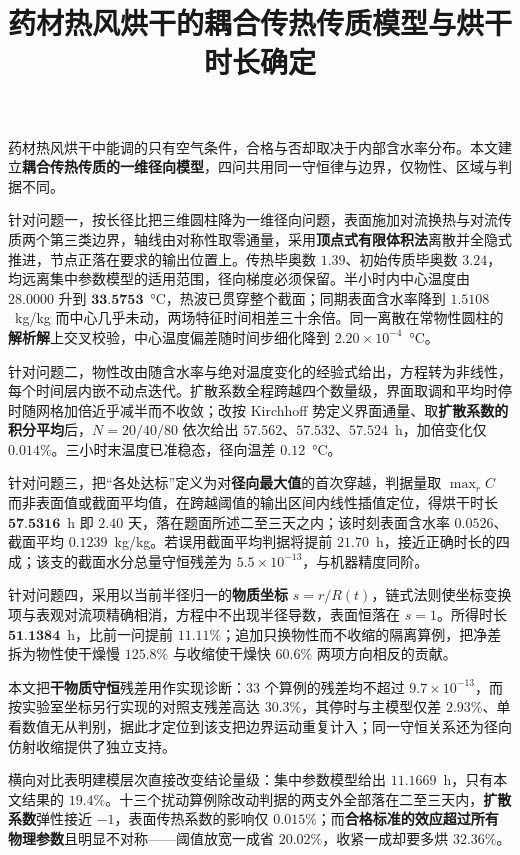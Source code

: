 \documentclass[withoutpreface,bwprint]{cumcmthesis}
\title{药材热风烘干的耦合传热传质模型与烘干时长确定}
\makeatletter
\renewenvironment{abstract}{%
  \if@twocolumn\section*{\abstractname}%
  \else\begin{center}{\zihao{3}\bfseries \abstractname\vspace{-.5em}\vspace{\z@}}\end{center}\quotation
  \fi}{\if@twocolumn\else\endquotation\newpage\fi}
\makeatother
\begin{document}
\maketitle

\begin{abstract}

药材热风烘干中能调的只有空气条件，合格与否却取决于内部含水率分布。本文建立\textbf{耦合传热传质的一维径向模型}，四问共用同一守恒律与边界，仅物性、区域与判据不同。

针对问题一，按长径比把三维圆柱降为一维径向问题，表面施加对流换热与对流传质两个第三类边界，轴线由对称性取零通量，采用\textbf{顶点式有限体积法}离散并全隐式推进，节点正落在要求的输出位置上。传热毕奥数 $1.39$、初始传质毕奥数 $3.24$，均远离集中参数模型的适用范围，径向梯度必须保留。半小时内中心温度由 $28.0000$ 升到 $\textbf{33.5753}$~°C，热波已贯穿整个截面；同期表面含水率降到 $1.5108$~kg/kg 而中心几乎未动，两场特征时间相差三十余倍。同一离散在常物性圆柱的\textbf{解析解}上交叉校验，中心温度偏差随时间步细化降到 $2.20\times10^{-4}$~°C。

针对问题二，物性改由随含水率与绝对温度变化的经验式给出，方程转为非线性，每个时间层内嵌不动点迭代。扩散系数全程跨越四个数量级，界面取调和平均时停时随网格加倍近乎减半而不收敛；改按 Kirchhoff 势定义界面通量、取\textbf{扩散系数的积分平均}后，$N=20/40/80$ 依次给出 $57.562$、$57.532$、$57.524$~h，加倍变化仅 $0.014\%$。三小时末温度已准稳态，径向温差 $0.12$~°C。

针对问题三，把“各处达标”定义为对\textbf{径向最大值}的首次穿越，判据量取 $\max_r C$ 而非表面值或截面平均值，在跨越阈值的输出区间内线性插值定位，得烘干时长 $\textbf{57.5316}$~h 即 $2.40$ 天，落在题面所述二至三天之内；该时刻表面含水率 $0.0526$、截面平均 $0.1239$~kg/kg。若误用截面平均判据将提前 $21.70$~h，接近正确时长的四成；该支的截面水分总量守恒残差为 $5.5\times10^{-13}$，与机器精度同阶。

针对问题四，采用以当前半径归一的\textbf{物质坐标} $s=r/R(t)$，链式法则使坐标变换项与表观对流项精确相消，方程中不出现半径导数，表面恒落在 $s=1$。所得时长 $\textbf{51.1384}$~h，比前一问提前 $11.11\%$；追加只换物性而不收缩的隔离算例，把净差拆为物性使干燥慢 $125.8\%$ 与收缩使干燥快 $60.6\%$ 两项方向相反的贡献。

本文把\textbf{干物质守恒}残差用作实现诊断：$33$ 个算例的残差均不超过 $9.7\times10^{-13}$，而按实验室坐标另行实现的对照支残差高达 $30.3\%$，其停时与主模型仅差 $2.93\%$、单看数值无从判别，据此才定位到该支把边界运动重复计入；同一守恒关系还为径向仿射收缩提供了独立支持。

横向对比表明建模层次直接改变结论量级：集中参数模型给出 $11.1669$~h，只有本文结果的 $19.4\%$。十三个扰动算例除改动判据的两支外全部落在二至三天内，\textbf{扩散系数}弹性接近 $-1$，表面传热系数的影响仅 $0.015\%$；而\textbf{合格标准的效应超过所有物理参数}且明显不对称——阈值放宽一成省 $20.02\%$，收紧一成却要多烘 $32.36\%$。

\end{abstract}
\end{document}
